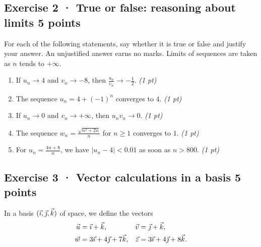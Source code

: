 \subsection*{Exercise 2 · True or false: reasoning about limits \hfill 5 points}For each of the following statements, say whether it is true or false and justify your answer. An unjustified answer earns no marks. Limits of sequences are taken as $n$ tends to $+\infty$.

\begin{enumerate}

\item If $u_n\to 4$ and $v_n\to-8$, then $\frac{u_n}{v_n}\to-\frac{1}{2}$. \hfill\textit{(1 pt)}

\item The sequence $u_n=4+(-1)^n$ converges to $4$. \hfill\textit{(1 pt)}

\item If $u_n\to0$ and $v_n\to+\infty$, then $u_nv_n\to0$. \hfill\textit{(1 pt)}

\item The sequence $w_n=\frac{\sqrt{n^2+2n}}{n}$ for $n\ge1$ converges to $1$. \hfill\textit{(1 pt)}

\item For $u_n=\frac{4n+8}{n}$, we have $|u_n-4|<0.01$ as soon as $n> 800$. \hfill\textit{(1 pt)}

\end{enumerate}

\clearpage{}\par

\subsection*{Exercise 3 · Vector calculations in a basis \hfill 5 points}In a basis $(\vec{\imath},\vec{\jmath},\vec k)$ of space, we define the vectors
\[\begin{aligned}\vec u&=\vec{\imath}+\vec k,&\vec v&=\vec{\jmath}+\vec k,\\
\vec w&=3\vec{\imath}+4\vec{\jmath}+7\vec k,&\vec z&=3\vec{\imath}+4\vec{\jmath}+8\vec k.\end{aligned}\]

